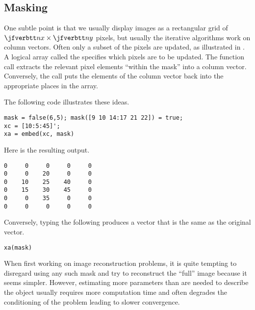 
\subsection{Masking}

One subtle point is that we usually display images
as a rectangular grid of $\ty{nx} \times \ty{ny}$ pixels,
but usually the iterative algorithms
work on column vectors.
Often only a subset of the pixels are updated,
as illustrated in
.
A logical array called the 
specifies which pixels are to be updated.
The function call
extracts the relevant pixel elements
``within the mask''
into a column vector.
Conversely, the call
puts the elements of the column vector
back into the appropriate places
in the array.

\newcommand{\fdir}{book/c-reg/fig}

The following code illustrates these ideas.

\begin{verbatim}
mask = false(6,5); mask([9 10 14:17 21 22]) = true;
xc = [10:5:45]';
xa = embed(xc, mask)
\end{verbatim}

\noindent
Here is the resulting output.

\begin{verbatim}
0     0     0     0     0
0     0    20     0     0
0    10    25    40     0
0    15    30    45     0
0     0    35     0     0
0     0     0     0     0
\end{verbatim}

\noindent
Conversely,
typing the following
produces a vector that is the same as the original  vector.
\begin{verbatim}
xa(mask)
\end{verbatim}

When first working on image reconstruction problems,
it is quite tempting to disregard
using any such mask
and try to reconstruct
the ``full'' image
because it seems simpler.
However,
estimating more parameters than are needed
to describe the object
usually requires more computation time
and often degrades the conditioning
of the problem
leading to slower convergence.
